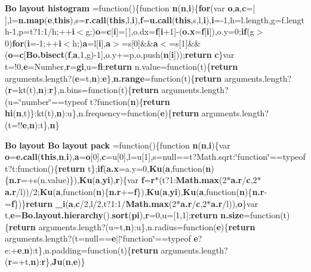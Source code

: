 \begin{DoxyCompactItemize}
{\bf Bo} {\bf layout} {\bf histogram} =function()\{function {\bf n}({\bf n},{\bf i})\{{\bf for}(var {\bf o},{\bf a},{\bf c}=[$\,$],l={\bf n.\+map}({\bf e},{\bf this}),s={\bf r.\+call}({\bf this},l,{\bf i}),{\bf f}={\bf u.\+call}({\bf this},s,l,{\bf i}),{\bf i}=-\/1,h=l.\+length,g=f.\+length-\/1,p=t?1\+:1/h;++{\bf i}$<$g;){\bf o}={\bf c}[{\bf i}]=[$\,$],o.\+dx={\bf f}[{\bf i}+1]-\/({\bf o.\+x}={\bf f}[{\bf i}]),o.\+y=0;{\bf if}(g$>$0){\bf for}({\bf i}=-\/1;++{\bf i}$<$h;){\bf a}=l[{\bf i}],{\bf a}$>$=s[0]\&\&{\bf a}$<$=s[1]\&\&({\bf o}={\bf c}[{\bf Bo.\+bisect}({\bf f},{\bf a},1,g)-\/1],o.\+y+=p,o.\+push({\bf n}[{\bf i}]));{\bf return} {\bf c}\}var t=!0,{\bf e}=Number,{\bf r}={\bf gi},u={\bf fi};{\bf return} n.\+value=function(t)\{{\bf return} arguments.\+length?({\bf e}=t,{\bf n})\+:{\bf e}\},{\bf n.\+range}=function(t)\{{\bf return} arguments.\+length?({\bf r}=kt(t),{\bf n})\+:{\bf r}\},n.\+bins=function(t)\{{\bf return} arguments.\+length?(u=\char`\"{}number\char`\"{}==typeof t?function({\bf n})\{{\bf return} {\bf hi}({\bf n},t)\}\+:kt(t),{\bf n})\+:u\},n.\+frequency=function({\bf e})\{{\bf return} arguments.\+length?(t=!!{\bf e},{\bf n})\+:t\},{\bf n}\}
\item 
{\bf Bo} {\bf layout} {\bf Bo} {\bf layout} {\bf pack} =function()\{function {\bf n}({\bf n},{\bf i})\{var {\bf o}={\bf e.\+call}({\bf this},{\bf n},{\bf i}),{\bf a}={\bf o}[0],{\bf c}=u[0],l=u[1],s=null==t?Math.\+sqrt\+:\char`\"{}function\char`\"{}==typeof t?t\+:function()\{{\bf return} t\};{\bf if}({\bf a.\+x}=a.\+y=0,{\bf Ku}({\bf a},function({\bf n})\{{\bf n.\+r}=+s(n.\+value)\}),{\bf Ku}({\bf a},{\bf yi}),{\bf r})\{var {\bf f}={\bf r}$\ast$(t?1\+:{\bf Math.\+max}(2$\ast${\bf a.\+r}/{\bf c},2$\ast${\bf a.\+r}/l))/2;{\bf Ku}({\bf a},function({\bf n})\{{\bf n.\+r}+={\bf f}\}),{\bf Ku}({\bf a},{\bf yi}),{\bf Ku}({\bf a},function({\bf n})\{{\bf n.\+r}-\/={\bf f}\})\}{\bf return} {\bf \+\_\+i}({\bf a},{\bf c}/2,l/2,t?1\+:1/{\bf Math.\+max}(2$\ast${\bf a.\+r}/{\bf c},2$\ast${\bf a.\+r}/l)),{\bf o}\}var t,{\bf e}={\bf Bo.\+layout.\+hierarchy}().{\bf sort}({\bf pi}),{\bf r}=0,u=[1,1];{\bf return} {\bf n.\+size}=function(t)\{{\bf return} arguments.\+length?(u=t,{\bf n})\+:u\},n.\+radius=function({\bf e})\{{\bf return} arguments.\+length?(t=null=={\bf e}$\vert$$\vert$\char`\"{}function\char`\"{}==typeof {\bf e}?e\+:+{\bf e},{\bf n})\+:t\},n.\+padding=function(t)\{{\bf return} arguments.\+length?({\bf r}=+t,{\bf n})\+:{\bf r}\},{\bf Ju}({\bf n},{\bf e})\}
\item 
$$
\end{DoxyCompactItemize}
